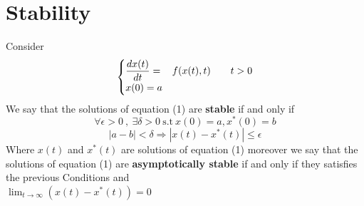 \section{Stability}

Consider
\begin{equation}
    \begin{cases}
        \displaystyle \frac{dx(t)}{dt} = & f(x(t),t) \quad\quad t>0
        \\
        x(0) = a
    \end{cases}
\end{equation}
We say that the solutions of equation (1) are \textbf{stable} if and only if
\[
    \forall \epsilon >0 \  , \ \exists \delta >0 \ \text{s.t} \  x(0)=a , x^*(0)=b
\]\[
    \left\lvert a-b \right\rvert < \delta \Longrightarrow
    \left\lvert x(t) - x^*(t) \right\rvert \leq \epsilon
\]
Where $x(t)$ and $x^*(t)$ are solutions of equation (1) moreover we
say that the solutions of equation (1) are \textbf{asymptotically stable} if and only if they
satisfies the previous Conditions and \\ $\displaystyle \lim_{t \to \infty} (x(t) - x^*(t)) = 0$

